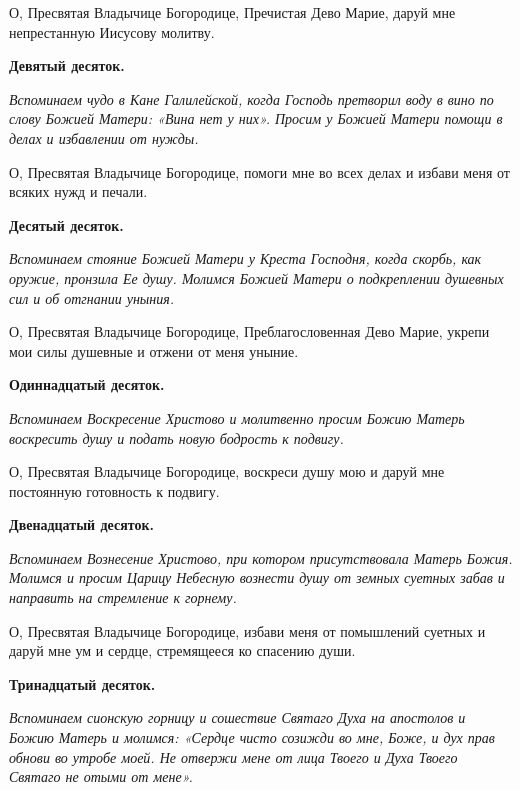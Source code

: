 \normalfont{}О, Пресвятая Владычице Богородице, Пречистая Дево Марие, даруй мне непрестанную Иисусову молитву.


\medskip


\bfseries Девятый десяток.\normalfont{}\nopagebreak


\itshape Вспоминаем чудо в Кане Галилейской, когда Господь претворил воду в вино по слову Божией Матери: «Вина нет у них». Просим у Божией Матери помощи в делах и избавлении от нужды.

\normalfont{}О, Пресвятая Владычице Богородице, помоги мне во всех делах и избави меня от всяких нужд и печали.


\medskip


\bfseries Десятый десяток.\normalfont{}\nopagebreak


\itshape Вспоминаем стояние Божией Матери у Креста Господня, когда скорбь, как оружие, пронзила Ее душу. Молимся Божией Матери о подкреплении душевных сил и об отгнании уныния.

\normalfont{}О, Пресвятая Владычице Богородице, Преблагословенная Дево Марие, укрепи мои силы душевные и отжени от меня уныние.


\medskip


\bfseries Одиннадцатый десяток.\normalfont{}\nopagebreak


\itshape Вспоминаем Воскресение Христово и молитвенно просим Божию Матерь воскресить душу и подать новую бодрость к подвигу.

\normalfont{}О, Пресвятая Владычице Богородице, воскреси душу мою и даруй мне постоянную готовность к подвигу.


\medskip


\bfseries Двенадцатый десяток.\normalfont{}\nopagebreak


\itshape Вспоминаем Вознесение Христово, при котором присутствовала Матерь Божия. Молимся и просим Царицу Небесную вознести душу от земных суетных забав и направить на стремление к горнему.

\normalfont{}О, Пресвятая Владычице Богородице, избави меня от помышлений суетных и даруй мне ум и сердце, стремящееся ко спасению души.


\medskip


\bfseries Тринадцатый десяток.\normalfont{}\nopagebreak


\itshape Вспоминаем сионскую горницу и сошествие Святаго Духа на апостолов и Божию Матерь и молимся: «Сердце чисто созижди во мне, Боже, и дух прав обнови во утробе моей. Не отвержи мене от лица Твоего и Духа Твоего Святаго не отыми от мене».

